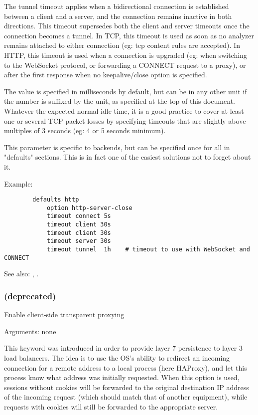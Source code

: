   The tunnel timeout applies when a bidirectional connection is established
  between a client and a server, and the connection remains inactive in both
  directions. This timeout supersedes both the client and server timeouts once
  the connection becomes a tunnel. In TCP, this timeout is used as soon as no
  analyzer remains attached to either connection (eg: tcp content rules are
  accepted). In HTTP, this timeout is used when a connection is upgraded (eg:
  when switching to the WebSocket protocol, or forwarding a CONNECT request
  to a proxy), or after the first response when no keepalive/close option is
  specified.

  The value is specified in milliseconds by default, but can be in any other
  unit if the number is suffixed by the unit, as specified at the top of this
  document. Whatever the expected normal idle time, it is a good practice to
  cover at least one or several TCP packet losses by specifying timeouts that
  are slightly above multiples of 3 seconds (eg: 4 or 5 seconds minimum).

  This parameter is specific to backends, but can be specified once for all in
  "defaults" sections. This is in fact one of the easiest solutions not to
  forget about it.

  Example:
  \begin{verbatim}
        defaults http
            option http-server-close
            timeout connect 5s
            timeout client 30s
            timeout client 30s
            timeout server 30s
            timeout tunnel  1h    # timeout to use with WebSocket and CONNECT
  \end{verbatim}


See also: , .

\subsubsection[transparent]{ (deprecated)}

  Enable client-side transparent proxying


  Arguments: none

  This keyword was introduced in order to provide layer 7 persistence to layer
  3 load balancers. The idea is to use the OS's ability to redirect an incoming
  connection for a remote address to a local process (here HAProxy), and let
  this process know what address was initially requested. When this option is
  used, sessions without cookies will be forwarded to the original destination
  IP address of the incoming request (which should match that of another
  equipment), while requests with cookies will still be forwarded to the
  appropriate server.

